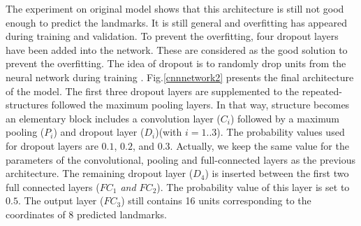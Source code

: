 \documentclass[10pt]{article}
\begin{document}
The experiment on original model shows that this architecture is still not good enough to predict the landmarks. It is still general and overfitting has appeared during training and validation.
To prevent the overfitting, four dropout layers have been added into the network. These are considered as the good solution to prevent the overfitting. The idea of dropout is to randomly drop units from the neural network during training \cite{srivastava2014dropout}. Fig.\ref{cnnnetwork2} presents the final architecture of the model. The first three dropout layers are supplemented to the repeated-structures followed the maximum pooling layers. In that way, structure becomes an elementary block includes a convolution layer (\textit{$C_i$}) followed by a maximum pooling (\textit{$P_i$}) and dropout layer (\textit{$D_i$})(with $i=1..3$). The probability values used for dropout layers are $0.1$, $0.2$, and $0.3$. Actually, we keep the same value for the parameters of the convolutional, pooling and full-connected layers as the previous architecture. 
The remaining dropout layer (\textit{$D_4$}) is inserted between the first
two full connected layers (\textit{$FC_1$ and $FC_2$}). The probability value of this layer
is set to $0.5$. The output layer (\textit{$FC_3$}) still contains 16 units corresponding to the coordinates of 8 predicted landmarks.
\end{document}
